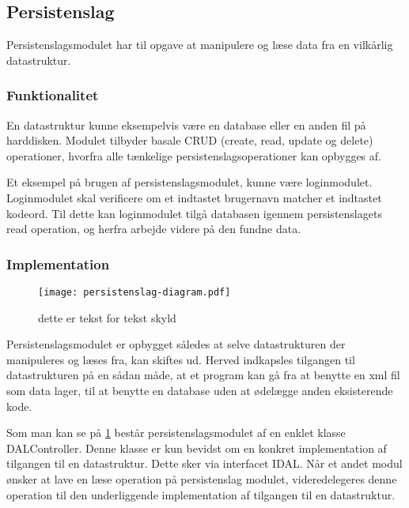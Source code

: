 \subsection{Persistenslag}
\label{sub:persistenslag}

Persistenslagsmodulet har til opgave at manipulere og læse data fra en vilkårlig datastruktur.

\subsubsection{Funktionalitet}
\label{ssub:persistenslag_funktionalitet}

En datastruktur kunne eksempelvis være en database eller en anden fil på harddisken. Modulet tilbyder basale CRUD (create, read, update og delete) operationer, hvorfra alle tænkelige persistenslagsoperationer kan opbygges af.

Et eksempel på brugen af persistenslagsmodulet, kunne være loginmodulet. Loginmodulet skal verificere om et indtastet brugernavn matcher et indtastet kodeord. Til dette kan loginmodulet tilgå databasen igennem persistenslagets read operation, og herfra arbejde videre på den fundne data.

\subsubsection{Implementation}
\label{ssub:persistenslag_implementation}
\begin{figure}
  \centering
  \texttt{[image: persistenslag-diagram.pdf]}
  \caption{dette er tekst for tekst skyld }
  \label{fig:permod}
\end{figure}

Persistenslagsmodulet er opbygget således at selve datastrukturen der manipuleres og læses fra, kan skiftes ud. Herved indkapsles tilgangen til datastrukturen på en sådan måde, at et program kan gå fra at benytte en xml fil som data lager, til at benytte en database uden at ødelægge anden eksisterende kode.

Som man kan se på \cref{fig:permod} består persistenslagsmodulet af en enklet klasse DALController. Denne klasse er kun bevidst om en konkret implementation af tilgangen til en datastruktur. Dette sker via interfacet IDAL. Når et andet modul ønsker at lave en læse operation på persistenslag modulet, videredelegeres denne operation til den underliggende implementation af tilgangen til en datastruktur.